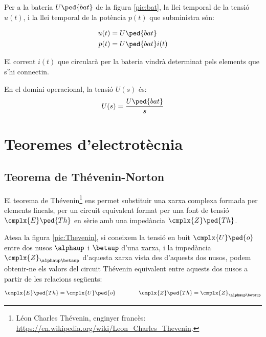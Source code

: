 Per a la bateria $U\ped{bat}$ de la figura
\vref{pic:bat}, la llei temporal de la tensió $u(t)$, i la llei temporal de la
potència $p(t)$ que subministra són:

\hfill
\begin{minipage}[b]{5cm}
	
	\label{pic:bat}
\end{minipage}
\hfill
\begin{minipage}[b][3cm][t]{8cm}
	\begin{align}
		u(t) &= U\ped{bat} \\  p(t) &= U\ped{bat} i(t)
	\end{align}
\end{minipage}


El corrent $i(t)$ que circularà per la bateria vindrà determinat
pels elements que s'hi connectin.

 En el domini operacional, la
tensió $U(s)$ és:
\begin{equation}
	U(s) = \frac{U\ped{bat}}{s}
\end{equation}



\section{Teoremes d'electrotècnia}\label{sec:teoremes}

\subsection{\texorpdfstring{Teorema de Thévenin-Norton}{Teorema de
            Thévenin-Norton}}\label{sec:T_N}

El teorema de Thévenin\footnote{Léon Charles Thévenin, enginyer francès:  \href{https://en.wikipedia.org/wiki/Leon_Charles_Thevenin}{https:/\!\!/en.wikipedia.org/wiki/Leon\_Charles\_Thevenin}.} ens permet
substituir una xarxa complexa formada per elements lineals, per un
circuit equivalent format per una font de tensió $\cmplx{E}\ped{Th}$
en sèrie amb una impedància $\cmplx{Z}\ped{Th}$.


Atesa la figura \vref{pic:Thevenin}, si coneixem la tensió en
buit $\cmplx{U}\ped{o}$ entre dos nusos $\alphaup$ i $\betaup$ d'una
xarxa, i la impedància $\cmplx{Z}_{\alphaup\betaup}$ d'aquesta xarxa
vista des d'aquests dos nusos, podem obtenir-ne els valors del circuit
Thévenin equivalent entre aquests dos nusos a partir de les
relacions següents:
\begin{equation}
   \cmplx{E}\ped{Th} = \cmplx{U}\ped{o} \qquad\qquad  \cmplx{Z}\ped{Th} = \cmplx{Z}_{\alphaup\betaup}
\end{equation}

